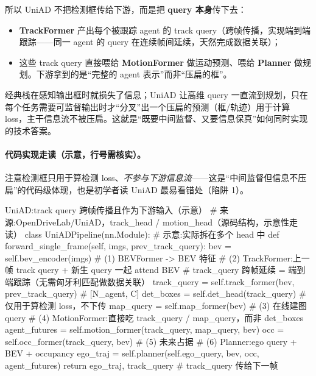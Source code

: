 所以 UniAD 不把检测框传给下游，而是把 \textbf{query 本身}传下去：
\begin{itemize}
  \item \textbf{TrackFormer} 产出每个被跟踪 agent 的 track query（跨帧传播，实现端到端跟踪——同一 agent 的 query 在连续帧间延续，天然完成数据关联）；
  \item 这些 track query 直接喂给 \textbf{MotionFormer} 做运动预测、喂给 \textbf{Planner} 做规划。下游拿到的是“完整的 agent 表示”而非“压扁的框”。
\end{itemize}

\begin{insight}
经典栈在感知输出框时就损失了信息；UniAD 让高维 query 一直流到规划，只在每个任务需要可监督输出时才“分叉”出一个压扁的预测（框/轨迹）用于计算 loss，主干信息流不被压扁。这就是“既要中间监督、又要信息保真”如何同时实现的技术答案。
\end{insight}

\paragraph{代码实现走读（示意，行号需核实）。}
注意检测框只用于算检测 loss、\emph{不参与下游信息流}——这是“中间监督但信息不压扁”的代码级体现，也是初学者读 UniAD 最易看错处（陷阱 1）。

\begin{codebox}[Python]{UniAD:track query 跨帧传播且作为下游输入（示意）}
# 来源:OpenDriveLab/UniAD，track_head / motion_head（源码结构，示意性走读）
class UniADPipeline(nn.Module):                 # 示意:实际拆在多个 head 中
    def forward_single_frame(self, imgs, prev_track_query):
        bev = self.bev_encoder(imgs)            # (1) BEVFormer -> BEV 特征
        # (2) TrackFormer:上一帧 track query + 新生 query 一起 attend BEV
        #     track_query 跨帧延续 = 端到端跟踪（无需匈牙利匹配做数据关联）
        track_query = self.track_former(bev, prev_track_query)   # [N_agent, C]
        det_boxes  = self.det_head(track_query)  # 仅用于算检测 loss，不下传
        map_query  = self.map_former(bev)        # (3) 在线建图 query
        # (4) MotionFormer:直接吃 track_query / map_query，而非 det_boxes
        agent_futures = self.motion_former(track_query, map_query, bev)
        occ = self.occ_former(track_query, bev)  # (5) 未来占据
        # (6) Planner:ego query + BEV + occupancy
        ego_traj = self.planner(self.ego_query, bev, occ, agent_futures)
        return ego_traj, track_query             # track_query 传给下一帧
\end{codebox}

